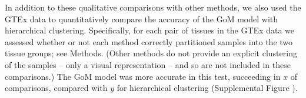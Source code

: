 \documentclass[10pt,letterpaper]{article}
\begin{document}
In addition to these qualitative comparisons with other methods, we also used the GTEx data to quantitatively compare the accuracy of the GoM model with
hierarchical clustering. Specifically, for each pair of tissues in the GTEx data we assessed whether or not each method correctly partitioned samples into the two tissue groups; see Methods. (Other methods do not provide an explicit clustering of the samples -- only a visual representation -- and so are not included in these comparisons.) The GoM model was more accurate in this test, succeeding in $x$ of comparisons, compared with $y$ for hierarchical clustering (Supplemental Figure ).

\end{document}
